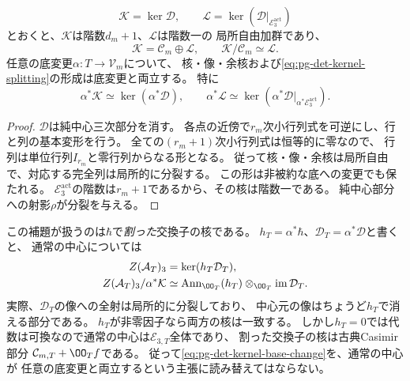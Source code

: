 \begin{lemma}[割った交換子の核と底変更]
\label{lem:pg-det-divided-kernel}
\begin{equation}
 \mathcal K=\ker\mathcal D,\qquad
 \mathcal L=\ker(\mathcal D|_{\mathcal E_3^{\mathrm{act}}})
 \label{eq:pg-det-kernel-line}
\end{equation}
とおくと、$\mathcal K$は階数$d_m+1$、$\mathcal L$は階数一の
局所自由加群であり、
\begin{equation}
 \mathcal K=\mathcal C_m\oplus\mathcal L,
 \qquad \mathcal K/\mathcal C_m\simeq\mathcal L.
 \label{eq:pg-det-kernel-splitting}
\end{equation}
任意の底変更$\alpha:T\to\mathcal V_m$について、
核・像・余核および\eqref{eq:pg-det-kernel-splitting}の形成は底変更と両立する。
特に
\begin{equation}
 \alpha^*\mathcal K\simeq\ker(\alpha^*\mathcal D),
 \qquad
 \alpha^*\mathcal L\simeq
 \ker(\alpha^*\mathcal D|_{\alpha^*\mathcal E_3^{\mathrm{act}}}).
 \label{eq:pg-det-kernel-base-change}
\end{equation}
\end{lemma}
\begin{proof}
$\mathcal D$は純中心三次部分を消す。
各点の近傍で$r_m$次小行列式を可逆にし、行と列の基本変形を行う。
全ての$(r_m+1)$次小行列式は恒等的に零なので、
行列は単位行列$I_{r_m}$と零行列からなる形となる。
従って核・像・余核は局所自由で、対応する完全列は局所的に分裂する。
この形は非被約な底への変更でも保たれる。
$\mathcal E_3^{\mathrm{act}}$の階数は$r_m+1$であるから、その核は階数一である。
純中心部分への射影$\rho$が分裂を与える。
\end{proof}

\begin{remark}[通常の中心の形成との区別]
\label{rem:pg-det-center-base-change}
この補題が扱うのは$\hbar$で\emph{割った}交換子の核である。
$h_T=\alpha^*\hbar$、$\mathcal D_T=\alpha^*\mathcal D$と書くと、
通常の中心については
\begin{equation}
 \begin{aligned}
 Z(\mathcal A_T)_3&=\ker(h_T\mathcal D_T),\\
 Z(\mathcal A_T)_3/\alpha^*\mathcal K
 &\simeq
 \operatorname{Ann}_{\OO_T}(h_T)
 \otimes_{\OO_T}\operatorname{im}\mathcal D_T.
 \end{aligned}
 \label{eq:pg-det-ordinary-center-base-change}
\end{equation}
実際、$\mathcal D_T$の像への全射は局所的に分裂しており、
中心元の像はちょうど$h_T$で消える部分である。
$h_T$が非零因子なら両方の核は一致する。
しかし$h_T=0$では代数は可換なので通常の中心は$\mathcal E_{3,T}$全体であり、
割った交換子の核は古典Casimir部分
$\mathcal C_{m,T}+\OO_T f$である。
従って\eqref{eq:pg-det-kernel-base-change}を、通常の中心が
任意の底変更と両立するという主張に読み替えてはならない。
\end{remark}

